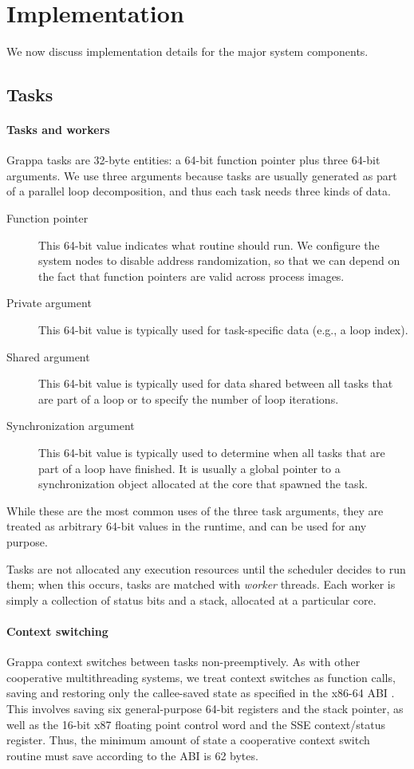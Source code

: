\section{Implementation} \label{sec:implementation}

We now discuss implementation details for the major system components.

\subsection{Tasks}

\paragraph{Tasks and workers} Grappa tasks are 32-byte entities: a
64-bit function pointer plus three 64-bit arguments. We use three
arguments because tasks are usually generated as part of a parallel loop
decomposition, and thus each task needs three kinds of data.
\begin{description}
\item[Function pointer] This 64-bit value indicates what routine
  should run. We configure the system nodes to disable address randomization, so that we can depend on the fact that function pointers are valid across process images.
\item[Private argument] This 64-bit value is typically used for task-specific
  data (e.g., a loop index).
\item[Shared argument] This 64-bit value is typically used for data shared
  between all tasks that are part of a loop or to specify the number
  of loop iterations.
\item[Synchronization argument] This 64-bit value is typically used to determine
  when all tasks that are part of a loop have finished. It is usually
  a global pointer to a synchronization object allocated at the core
  that spawned the task.
\end{description}
While these are the most common uses of the three task arguments, they
are treated as arbitrary 64-bit values in the runtime, and can be used
for any purpose.

Tasks are not allocated any execution resources until the scheduler
decides to run them; when this occurs, tasks are matched with {\em
  worker} threads. Each worker is simply a collection of status bits and a
stack, allocated at a particular core.

\paragraph{Context switching} Grappa context switches between tasks
non-preemptively. As with other cooperative multithreading systems, we
treat context switches as function calls, saving and restoring only the
callee-saved state as specified in the x86-64 ABI \cite{someone}. This
involves saving six general-purpose 64-bit registers and the stack
pointer, as well as the 16-bit x87 floating point control word and the
SSE context/status register. Thus, the minimum amount of state a
cooperative context switch routine must save according to the ABI is 62
bytes.

